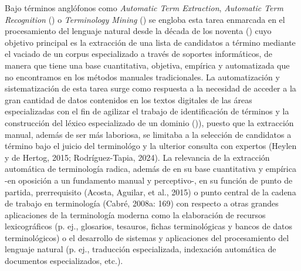 Bajo términos anglófonos como \emph{Automatic Term Extraction}, \emph{Automatic Term Recognition} (\cite{acosta2015reconocimiento,astrakhantsev2015methods}) o \emph{Terminology Mining} (\cite{daille2003conceptual}) se engloba esta tarea enmarcada en el procesamiento del lenguaje natural desde la década de los noventa (\cite{heylen2015automatic}) cuyo objetivo principal es la extracción de una lista de candidatos a término mediante el vaciado de un corpus especializado a través de soportes informáticos, de manera que tiene una base cuantitativa, objetiva, empírica y automatizada que no encontramos en los métodos manuales tradicionales. La automatización y sistematización de esta tarea surge como respuesta a la necesidad de acceder a la gran cantidad de datos contenidos en los textos digitales de las áreas especializadas con el fin de agilizar el trabajo de identificación de términos y la construcción del léxico especializado de un dominio (\cite{acosta2015reconocimiento,heylen2015automatic})), puesto que la extracción manual, además de ser más laboriosa, se limitaba a la selección de candidatos a término bajo el juicio del terminológo y la ulterior consulta con expertos (Heylen y de Hertog, 2015; Rodríguez-Tapia, 2024). La relevancia de la extracción automática de terminología radica, además de en su base cuantitativa y empírica -en oposición a un fundamento manual y perceptivo-, en su función de punto de partida, prerrequisito (Acosta, Aguilar, et al., 2015) o punto central de la cadena de trabajo en terminología (Cabré, 2008a: 169) con respecto a otras grandes aplicaciones de la terminología moderna como la elaboración de recursos lexicográficos (p. ej., glosarios, tesauros, fichas terminológicas y bancos de datos terminológicos) o el desarrollo de sistemas y aplicaciones del procesamiento del lenguaje natural (p. ej., traducción especializada, indexación automática de documentos especializados, etc.).

